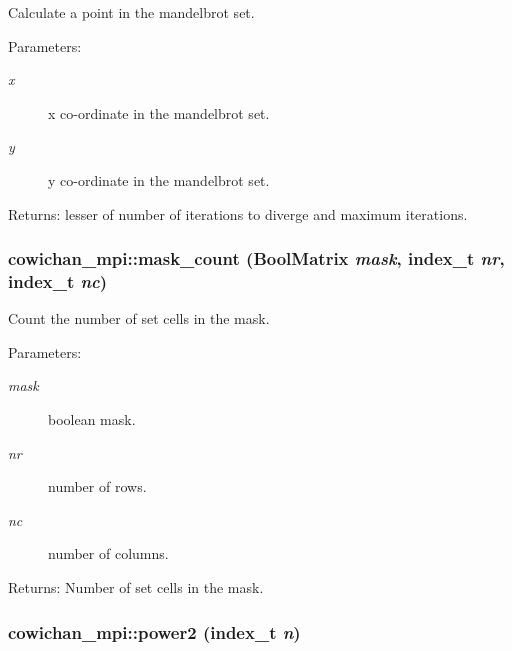 Calculate a point in the mandelbrot set. \begin{Desc}
\item[Parameters:]
\begin{description}
\item[{\em x}]x co-ordinate in the mandelbrot set. \item[{\em y}]y co-ordinate in the mandelbrot set. \end{description}
\end{Desc}
\begin{Desc}
\item[Returns:]lesser of number of iterations to diverge and maximum iterations. \end{Desc}
\hypertarget{namespacecowichan__mpi_a54004a105356573d4bac92e1b234aa2}{
\subsubsection[{mask\_\-count}]{ cowichan\_\-mpi::mask\_\-count ({\bf BoolMatrix} {\em mask}, \/  {\bf index\_\-t} {\em nr}, \/  {\bf index\_\-t} {\em nc})}}
\label{namespacecowichan__mpi_a54004a105356573d4bac92e1b234aa2}


Count the number of set cells in the mask. \begin{Desc}
\item[Parameters:]
\begin{description}
\item[{\em mask}]boolean mask. \item[{\em nr}]number of rows. \item[{\em nc}]number of columns. \end{description}
\end{Desc}
\begin{Desc}
\item[Returns:]Number of set cells in the mask. \end{Desc}
\hypertarget{namespacecowichan__mpi_a7c14e0bec9c9da1d56a348c9a0cf1f8}{
\subsubsection[{power2}]{ cowichan\_\-mpi::power2 ({\bf index\_\-t} {\em n})}}
\label{namespacecowichan__mpi_a7c14e0bec9c9da1d56a348c9a0cf1f8}


